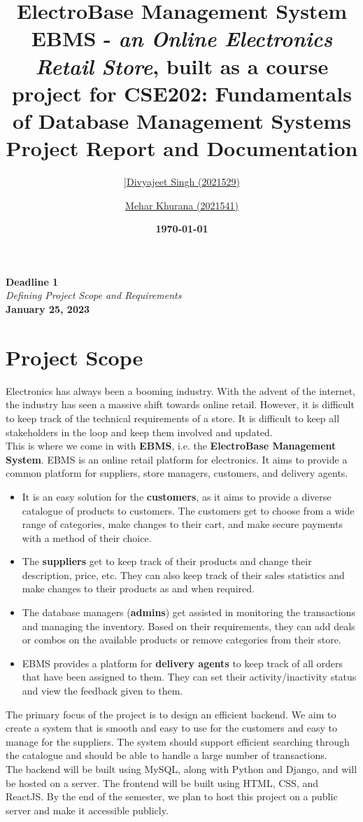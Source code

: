 \documentclass[12pt]{report}
\title{
    \textbf{\Huge ElectroBase Management System} \\
    \vspace*{15pt}
    \large{
        EBMS - \textit{an Online Electronics Retail Store}, built as a course project for
        \normalsize{CSE202: Fundamentals of Database Management Systems} \\
    }
    \vspace*{20pt}
    \textbf{\Large Project Report and Documentation}
}
\author{
    \href{mailto:divyajeet21529@iiitd.ac.in}{]Divyajeet Singh (2021529)}
    \and
    \href{mailto:mehar21541@iiitd.ac.in}{Mehar Khurana (2021541)}
}
\date{\vspace*{10pt} \textbf{\today}}
\newcommand{\deadline}[3]{
    \hspace{0pt}
    \vfill
    \begin{center}
        \Huge \textbf{Deadline #1} \\
        \vspace*{5pt}
        \Large \textit{#2} \\
        \vspace*{25pt}
        \large \textbf{#3}
    \end{center}
    \vfill
    \pagebreak
}
\begin{document}
    \maketitle

    \deadline{1}{Defining Project Scope and Requirements}{January 25, 2023}

    \section*{\Huge Project Scope}
    \vspace*{10pt}
    Electronics has always been a booming industry.
    With the advent of the internet, the industry has seen a massive shift towards online retail.
    However, it is difficult to keep track of the technical requirements of a store.
    It is difficult to keep all stakeholders in the loop and keep them involved and updated.
    \vspace*{10pt} \\
    This is where we come in with \textbf{EBMS}, i.e. the \textbf{ElectroBase Management System}.
    EBMS is an online retail platform for electronics.
    It aims to provide a common platform for suppliers, store managers, customers, and delivery agents.
    \begin{itemize}
        \item
        It is an easy solution for the \textbf{customers}, as it aims to provide a diverse catalogue of products to customers.
        The customers get to choose from a wide range of categories, make changes to their cart, and make secure payments with a method of their choice.
        \item
        The \textbf{suppliers} get to keep track of their products and change their description, price, etc.
        They can also keep track of their sales statistics and make changes to their products as and when required.
        \item
        The database managers (\textbf{admins}) get assisted in monitoring the transactions and managing the inventory.
        Based on their requirements, they can add deals or combos on the available products or remove categories from their store.
        \item
        EBMS provides a platform for \textbf{delivery agents} to keep track of all orders that have been assigned to them. They can set their activity/inactivity status and view the feedback given to them.
    \end{itemize}
    The primary focus of the project is to design an efficient backend.
    We aim to create a system that is smooth and easy to use for the customers and easy to manage for the suppliers.
    The system should support efficient searching through the catalogue and should be able to handle a large number of transactions.
    \vspace*{10pt} \\
    The backend will be built using MySQL, along with Python and Django, and will be hosted on a server.
    The frontend will be built using HTML, CSS, and ReactJS.
    By the end of the semester, we plan to host this project on a public server and make it accessible publicly.
\end{document}
